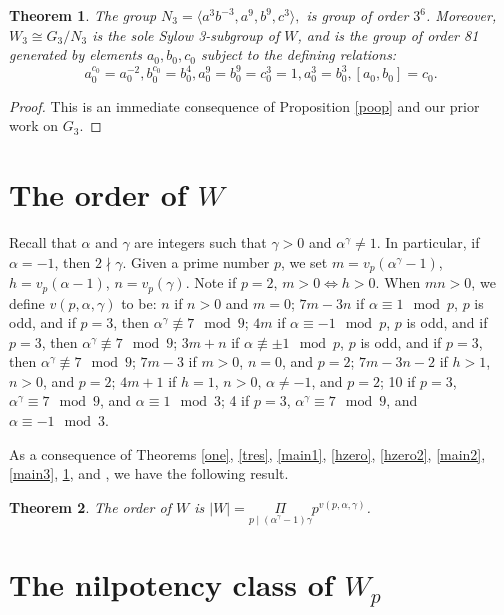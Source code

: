 \documentclass{amsart}
\newtheorem{theorem}{Theorem}[section]
\theoremstyle{definition}
\theoremstyle{remark}
\begin{document}
{\begin{theorem}\label{poop2} The group
$
N_3=\langle a^3b^{-3}, a^9, b^9,c^3\rangle,
$
is group of order $3^6$. Moreover, $W_3\cong G_3/N_3$ is the sole Sylow 3-subgroup of $W$, and is
the group of order 81 generated by elements $a_0,b_0,c_0$ subject to the defining
relations:
$$
a_0^{c_0}=a_0^{-2}, b_0^{c_0}=b_0^{4}, a_0^9=b_0^9=c_0^3=1, a_0^3=b_0^3, [a_0,b_0]=c_0.
$$
\end{theorem}

\begin{proof} This is an immediate consequence of Proposition \ref{poop} and our prior work on $G_3$.
\end{proof}

\section{The order of $W$}

Recall that $\alpha$ and $\gamma$ are integers such that $\gamma>0$ and $\alpha^\gamma\neq 1$.
In particular, if $\alpha=-1$, then $2\nmid\gamma$. Given a prime number $p$,
we set $m=v_p(\alpha^\gamma-1)$, $h=v_p(\alpha-1)$, $n=v_p(\gamma)$. Note if $p=2$, $m>0\Leftrightarrow h>0$.
When $mn>0$, we define $v(p,\alpha,\gamma)$
to be: $n$ if $n>0$ and $m=0$; $7m-3n$ if $\alpha\equiv 1\mod p$, $p$ is odd, and if $p=3$, then $\alpha^\gamma\not\equiv 7\mod 9$; 
$4m$ if $\alpha\equiv -1\mod p$, $p$ is odd, and if $p=3$, then $\alpha^\gamma\not\equiv 7\mod 9$;
$3m+n$ if $\alpha\not\equiv \pm 1\mod p$, $p$ is odd, and if $p=3$, then $\alpha^\gamma\not\equiv 7\mod 9$;
$7m-3$ if $m>0$, $n=0$, and $p=2$; $7m-3n-2$ if $h>1$, $n>0$, and $p=2$; $4m+1$ if $h=1$, $n>0$, $\alpha\neq -1$, and $p=2$; 
10 if $p=3$, $\alpha^\gamma\equiv 7\mod 9$, and $\alpha\equiv 1\mod 3$; 4 if $p=3$, $\alpha^\gamma\equiv 7\mod 9$, and $\alpha\equiv -1\mod 3$.


As a consequence of Theorems \ref{one}, \ref{tres}, \ref{main1}, \ref{hzero}, \ref{hzero2}, \ref{main2}, \ref{main3}, \ref{poop2}, and 
\cite[Theorem 7.1]{MS}, we have the following result.

\begin{theorem}\label{orderW} The order of $W$ is
$|W|=\underset{p\mid (\alpha^\gamma-1)\gamma}\Pi p^{v(p,\alpha,\gamma)}$.
\end{theorem}

\section{The nilpotency class of $W_p$}

}
\end{document}
